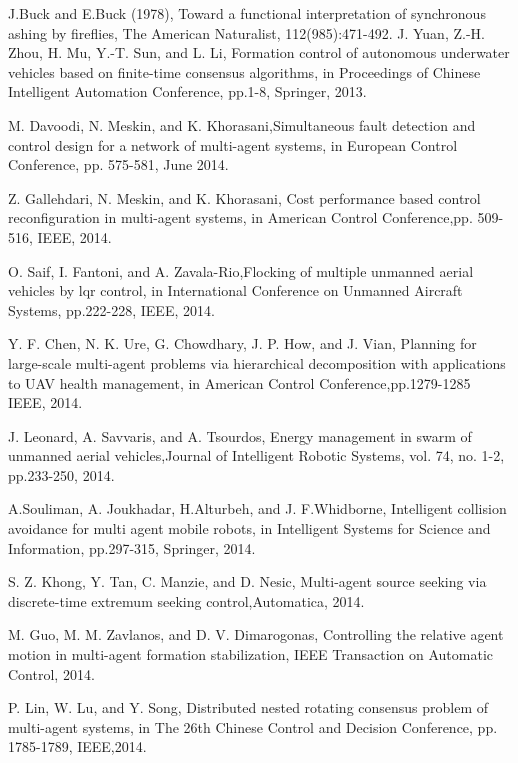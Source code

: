 \begin{thebibliography}{99}

	 J.Buck and E.Buck (1978), Toward a functional interpretation of synchronous ashing by fireflies, The American Naturalist, 112(985):471-492.
	J. Yuan, Z.-H. Zhou, H. Mu, Y.-T. Sun, and L. Li, Formation control
 of autonomous underwater vehicles based on finite-time consensus algorithms,
	in Proceedings of Chinese Intelligent Automation Conference,
	pp.1-8, Springer, 2013.
	
	M. Davoodi, N. Meskin, and K. Khorasani,Simultaneous fault detection and control design for a network of multi-agent systems, in European Control Conference, pp. 575-581, June 2014.
	
	 Z. Gallehdari, N. Meskin, and K. Khorasani, Cost performance based control reconfiguration in multi-agent systems, in American Control
	 Conference,pp. 509-516, IEEE, 2014.
	
	 O. Saif, I. Fantoni, and A. Zavala-Rio,Flocking of multiple unmanned aerial vehicles by lqr control, in International Conference on Unmanned Aircraft Systems, pp.222-228, IEEE, 2014.
	
    Y. F. Chen, N. K. Ure, G. Chowdhary, J. P. How, and J. Vian, Planning for large-scale multi-agent problems via hierarchical decomposition with applications to UAV health management, in American Control Conference,pp.1279-1285 IEEE, 2014.
	
	J. Leonard, A. Savvaris, and A. Tsourdos, Energy management in swarm of unmanned aerial vehicles,Journal of Intelligent  Robotic Systems, vol. 74, no. 1-2, pp.233-250, 2014.
	
    A.Souliman, A. Joukhadar, H.Alturbeh, and J. F.Whidborne, Intelligent collision avoidance for multi agent mobile robots, in Intelligent Systems for Science and Information, pp.297-315, Springer, 2014.
	
   S. Z. Khong, Y. Tan, C. Manzie, and D. Nesic, Multi-agent source seeking via discrete-time extremum seeking control,Automatica, 2014.
	
   M. Guo, M. M. Zavlanos, and D. V. Dimarogonas, Controlling the relative agent motion in multi-agent formation stabilization, IEEE Transaction on Automatic Control, 2014.
	
  P. Lin, W. Lu, and Y. Song, Distributed nested rotating consensus problem of multi-agent systems, in The 26th Chinese Control and Decision Conference, pp. 1785-1789, IEEE,2014.
	

\end{thebibliography}
